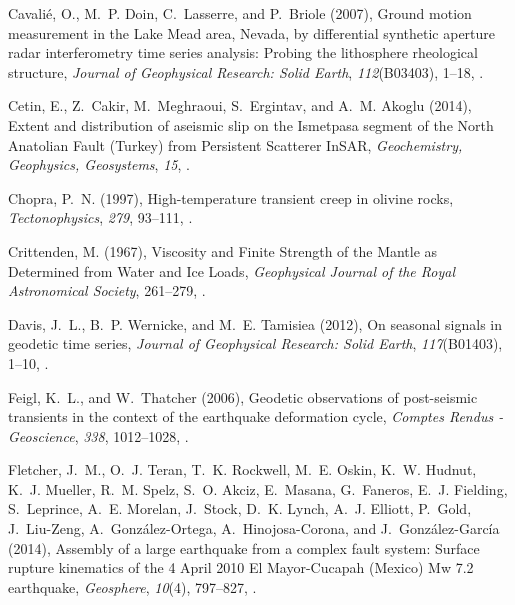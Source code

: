 \documentclass[draft,linenumbers]{AGUJournal}
\begin{document}
\begin{thebibliography}{52}
Cavali{\'{e}}, O., M.~P. Doin, C.~Lasserre, and P.~Briole (2007), {Ground motion measurement in the Lake Mead area, Nevada, by differential synthetic aperture radar interferometry time series analysis: Probing the lithosphere rheological structure}, \textit{Journal of Geophysical Research: Solid Earth}, \textit{112}(B03403), 1--18, .

Cetin, E., Z.~Cakir, M.~Meghraoui, S.~Ergintav, and A.~M. Akoglu (2014), {Extent and distribution of aseismic slip on the Ismetpasa segment of the North Anatolian Fault (Turkey) from Persistent Scatterer InSAR}, \textit{Geochemistry, Geophysics, Geosystems}, \textit{15}, .

Chopra, P.~N. (1997), {High-temperature transient creep in olivine rocks}, \textit{Tectonophysics}, \textit{279}, 93--111, .

Crittenden, M. (1967), {Viscosity and Finite Strength of the Mantle as Determined from Water and Ice Loads}, \textit{Geophysical Journal of the Royal Astronomical Society}, 261--279, .

Davis, J.~L., B.~P. Wernicke, and M.~E. Tamisiea (2012), {On seasonal signals in geodetic time series}, \textit{Journal of Geophysical Research: Solid Earth}, \textit{117}(B01403), 1--10, .

Feigl, K.~L., and W.~Thatcher (2006), {Geodetic observations of post-seismic transients in the context of the earthquake deformation cycle}, \textit{Comptes Rendus - Geoscience}, \textit{338}, 1012--1028, .

Fletcher, J.~M., O.~J. Teran, T.~K. Rockwell, M.~E. Oskin, K.~W. Hudnut, K.~J. Mueller, R.~M. Spelz, S.~O. Akciz, E.~Masana, G.~Faneros, E.~J. Fielding, S.~Leprince, A.~E. Morelan, J.~Stock, D.~K. Lynch, A.~J. Elliott, P.~Gold, J.~Liu-Zeng, A.~Gonz{\'{a}}lez-Ortega, A.~Hinojosa-Corona, and J.~Gonz{\'{a}}lez-Garc{\'{i}}a (2014), {Assembly of a large earthquake from a complex fault system: Surface rupture kinematics of the 4 April 2010 El Mayor-Cucapah (Mexico) Mw 7.2 earthquake}, \textit{Geosphere}, \textit{10}(4), 797--827, .


\end{thebibliography}
\end{document}
